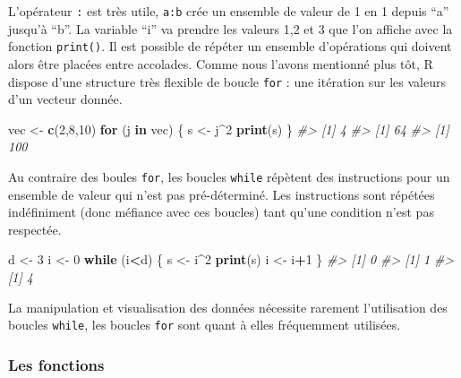 \documentclass[]{article}
\newenvironment{Shaded}{\begin{snugshade}}{\end{snugshade}}
\newcommand{\CommentTok}[1]{\textcolor[rgb]{0.56,0.35,0.01}{\textit{#1}}}
\newcommand{\ControlFlowTok}[1]{\textcolor[rgb]{0.13,0.29,0.53}{\textbf{#1}}}
\newcommand{\DecValTok}[1]{\textcolor[rgb]{0.00,0.00,0.81}{#1}}
\newcommand{\KeywordTok}[1]{\textcolor[rgb]{0.13,0.29,0.53}{\textbf{#1}}}
\newcommand{\NormalTok}[1]{#1}
\newcommand{\OperatorTok}[1]{\textcolor[rgb]{0.81,0.36,0.00}{\textbf{#1}}}
\newcommand{\StringTok}[1]{\textcolor[rgb]{0.31,0.60,0.02}{#1}}
\begin{document}
L'opérateur \texttt{:} est très utile, \texttt{a:b} crée un ensemble de valeur de 1 en 1 depuis ``a'' jusqu'à ``b''. La variable ``i'' va prendre les valeurs 1,2 et 3 que l'on affiche avec la fonction \texttt{print()}. Il est possible de répéter un ensemble d'opérations qui doivent alors être placées entre accolades.
Comme nous l'avons mentionné plus tôt, R dispose d'une structure très flexible de boucle \texttt{for} : une itération sur les valeurs d'un vecteur donnée.

\begin{Shaded}
\begin{Highlighting}[]
\NormalTok{vec <-}\StringTok{ }\KeywordTok{c}\NormalTok{(}\DecValTok{2}\NormalTok{,}\DecValTok{8}\NormalTok{,}\DecValTok{10}\NormalTok{)}
\ControlFlowTok{for}\NormalTok{ (j }\ControlFlowTok{in}\NormalTok{ vec) \{}
\NormalTok{  s <-}\StringTok{ }\NormalTok{j}\OperatorTok{^}\DecValTok{2}
  \KeywordTok{print}\NormalTok{(s)}
\NormalTok{\}}
\CommentTok{#> [1] 4}
\CommentTok{#> [1] 64}
\CommentTok{#> [1] 100}
\end{Highlighting}
\end{Shaded}

Au contraire des boules \texttt{for}, les boucles \texttt{while} répètent des instructions pour un ensemble de valeur qui n'est pas pré-déterminé. Les instructions sont répétées indéfiniment (donc méfiance avec ces boucles) tant qu'une condition n'est pas respectée.

\begin{Shaded}
\begin{Highlighting}[]
\NormalTok{d <-}\StringTok{ }\DecValTok{3}
\NormalTok{i <-}\StringTok{ }\DecValTok{0}
\ControlFlowTok{while}\NormalTok{ (i}\OperatorTok{<}\NormalTok{d) \{}
\NormalTok{  s <-}\StringTok{ }\NormalTok{i}\OperatorTok{^}\DecValTok{2}
  \KeywordTok{print}\NormalTok{(s)}
\NormalTok{  i <-}\StringTok{ }\NormalTok{i}\OperatorTok{+}\DecValTok{1}
\NormalTok{\}}
\CommentTok{#> [1] 0}
\CommentTok{#> [1] 1}
\CommentTok{#> [1] 4}
\end{Highlighting}
\end{Shaded}

La manipulation et visualisation des données nécessite rarement l'utilisation des boucles \texttt{while}, les boucles \texttt{for} sont quant à elles fréquemment utilisées.

\hypertarget{les-fonctions}{%
\subsubsection*{Les fonctions}\label{les-fonctions}}
\end{document}
